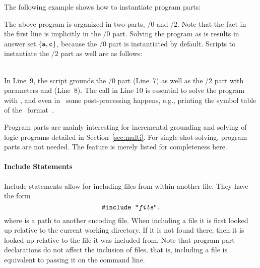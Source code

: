 \begin{example}
The following example shows how to instantiate program parts:

The above program is organized in two parts, /$0$ and /$2$.
Note that the fact in the first line is implicitly in the /$0$ part.
Solving the program as is results in answer set $\{\texttt{a}, \texttt{c}\}$,
because the /$0$ part is instantiated by default.
Scripts to instantiate the /$2$ part as well are as follows:%
%
\\[-8pt] %
\begin{minipage}[t]{0.5\textwidth}

\end{minipage}
\begin{minipage}[t]{0.5\textwidth}

\end{minipage}\\
%
In Line~9,
the script grounds the /$0$ part (Line~7)
as well as the /$2$ part with parameters  and  (Line~8).
The call in Line 10 is essential to solve the program with \clingo,
and even in \gringo\ some post-processing happens, e.g.,
printing the symbol table of the \smodels\ format~\cite{lparseManual}.
\end{example}

\begin{note}
Program parts are mainly interesting for incremental grounding and solving of logic programs detailed in Section~\ref{sec:multi}.
For single-shot solving, program parts are not needed.
The feature is merely listed for completeness here.
\end{note}

\paragraph{Include Statements}
Include statements allow for including files from within another file.
They have the form
%
\[\texttt{\#include~"{\itshape file}".}\]
%
where  is a path to another encoding file.
When including a file it is first looked up relative to the current working directory.
If it is not found there, then it is looked up relative to the file it was included from.
Note that program part declarations do not affect the inclusion of files,
that is, including a file is equivalent to passing it on the command line.


